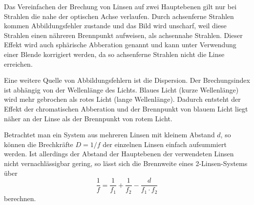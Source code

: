 Das Vereinfachen der Brechung von Linsen auf zwei Hauptebenen gilt nur bei Strahlen die nahe der optischen Achse verlaufen.
Durch achsenferne Strahlen kommen Abbildungsfehler zustande und das Bild wird unscharf, weil diese Strahlen einen nähreren Brennpunkt aufweisen, als achsennahe Strahlen.
Dieser Effekt wird auch sphärische Abberation genannt und kann unter Verwendung einer Blende korrigiert werden, da so achsenferne Strahlen nicht die Linse erreichen.

Eine weitere Quelle von Abbildungsfehlern ist die Dispersion.
Der Brechungsindex ist abhängig von der Wellenlänge des Lichts.
Blaues Licht (kurze Wellenlänge) wird mehr gebrochen als rotes Licht (lange Wellenlänge).
Dadurch entsteht der Effekt der chromatischen Abberation und der Brennpunkt von blauem Licht liegt näher an der Linse als der Brennpunkt von rotem Licht.

Betrachtet man ein System aus mehreren Linsen mit kleinem Abstand $d$, so können die Brechkräfte $D=1/f$ der einzelnen Linsen einfach aufsummiert werden.
Ist allerdings der Abstand der Hauptebenen der verwendeten Linsen nicht vernachlässigbar gering, so lässt sich die Brennweite eines 2-Linsen-Systems über
\begin{equation}
    \frac{1}{f} = \frac{1}{f_1} + \frac{1}{f_2} - \frac{d}{f_1 \cdot f_2}
    \label{eq:2linsen}
\end{equation}
berechnen.